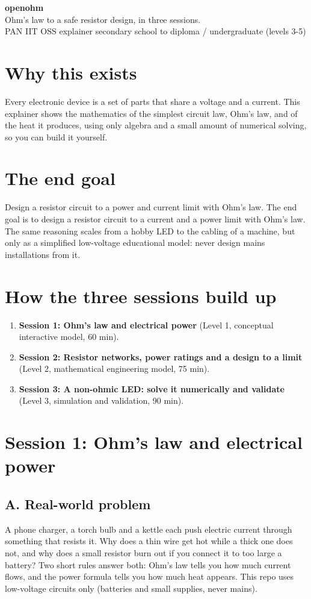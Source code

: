 \documentclass[11pt,a4paper]{article}
\begin{document}
\begin{center}{\LARGE\bfseries openohm}\\[0.4em]{\large Ohm's law to a safe resistor design, in three sessions.}\\[0.2em]\small PAN IIT OSS explainer \textbullet{} secondary school to diploma / undergraduate (levels 3-5)\end{center}

\section*{Why this exists}
Every electronic device is a set of parts that share a voltage and a current. This explainer shows the mathematics of the simplest circuit law, Ohm's law, and of the heat it produces, using only algebra and a small amount of numerical solving, so you can build it yourself.

\section*{The end goal}
Design a resistor circuit to a power and current limit with Ohm's law. The end goal is to design a resistor circuit to a current and a power limit with Ohm's law. The same reasoning scales from a hobby LED to the cabling of a machine, but only as a simplified low-voltage educational model: never design mains installations from it.

\section*{How the three sessions build up}
\begin{enumerate}[nosep]
\item \textbf{Session 1: Ohm's law and electrical power} (Level 1, conceptual interactive model, 60 min).
\item \textbf{Session 2: Resistor networks, power ratings and a design to a limit} (Level 2, mathematical engineering model, 75 min).
\item \textbf{Session 3: A non-ohmic LED: solve it numerically and validate} (Level 3, simulation and validation, 90 min).
\end{enumerate}

\section{Session 1: Ohm's law and electrical power}

\subsection*{A. Real-world problem}
A phone charger, a torch bulb and a kettle each push electric current through something that resists it. Why does a thin wire get hot while a thick one does not, and why does a small resistor burn out if you connect it to too large a battery? Two short rules answer both: Ohm's law tells you how much current flows, and the power formula tells you how much heat appears. This repo uses low-voltage circuits only (batteries and small supplies, never mains).
\end{document}
